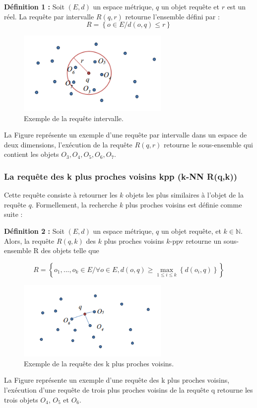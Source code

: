 \textbf{Définition 1 :} Soit $ (E,d ) $ un espace métrique, $ q $ un objet requête et $ r $ est un réel. La requête par intervalle $ R(q,r) $ retourne l’ensemble défini par :
\begin{equation}
	R = \left\{ o\in E / d(o, q) \leq r \right\}
\end{equation}

\begin{figure}[H]
	\centering
	\includegraphics[width=0.65\textwidth]{Figures/rangeQ} %
	\caption{Exemple de la requête intervalle.}
\end{figure}
La Figure représente un exemple d’une requête par intervalle dans un espace de
deux dimensions, l’exécution de la requête $ R(q,r) $ retourne le sous-ensemble qui contient les objets $ {O_3,O_4,O_5,O_6,O_7} $.

\subsubsection{La requête des k plus proches voisins kpp (k-NN R(q,k))}
Cette requête consiste à retourner les $ k $ objets les plus similaires à l’objet de la requête $ q $. Formellement, la recherche $ k $ plus proches voisins est définie comme suite :

\textbf{Définition 2 :} Soit $ (E,d ) $ un espace métrique, $ q $ un objet requête, et $ k \in \mathbb{N} $. Alors, la requête  $ R(q,k) $ des $ k $ plus proches voisins $ k $-ppv retourne un sous-ensemble R des objets telle que

\begin{equation}
R = \left\{ o_1,...,o_k \in E / \forall o \in E, d(o, q) \ge \max_{1\leq i \leq k}\left\{d(o_i, q)\right\}  \right\}
\end{equation}

\begin{figure}[H]
	\centering
	\includegraphics[width=0.65\textwidth]{Figures/knnQ} %
	\caption{Exemple de la requête des k plus proches voisins.}
\end{figure}
La Figure représente un exemple d’une requête des k plus proches voisins,
l’exécution d’une requête de trois plus proches voisins de la requête q retourne les trois objets $ O_4 $, $ O_5 $ et $ O_6 $.

